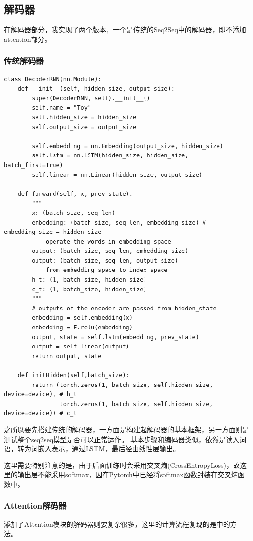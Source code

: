 \documentclass[logo,reportComp]{thesis}
\begin{document}
\subsection{解码器}
在解码器部分，我实现了两个版本，一个是传统的Seq2Seq中的解码器，即不添加attention部分。

\subsubsection{传统解码器}
\begin{lstlisting}
class DecoderRNN(nn.Module):
    def __init__(self, hidden_size, output_size):
        super(DecoderRNN, self).__init__()
        self.name = "Toy"
        self.hidden_size = hidden_size
        self.output_size = output_size

        self.embedding = nn.Embedding(output_size, hidden_size)
        self.lstm = nn.LSTM(hidden_size, hidden_size, batch_first=True)
        self.linear = nn.Linear(hidden_size, output_size)

    def forward(self, x, prev_state):
        """
        x: (batch_size, seq_len)
        embedding: (batch_size, seq_len, embedding_size) # embedding_size = hidden_size
            operate the words in embedding space
        output: (batch_size, seq_len, embedding_size)
        output: (batch_size, seq_len, output_size)
            from embedding space to index space
        h_t: (1, batch_size, hidden_size)
        c_t: (1, batch_size, hidden_size)
        """
        # outputs of the encoder are passed from hidden_state
        embedding = self.embedding(x)
        embedding = F.relu(embedding)
        output, state = self.lstm(embedding, prev_state)
        output = self.linear(output)
        return output, state

    def initHidden(self,batch_size):
        return (torch.zeros(1, batch_size, self.hidden_size, device=device), # h_t
                torch.zeros(1, batch_size, self.hidden_size, device=device)) # c_t
\end{lstlisting}

之所以要先搭建传统的解码器，一方面是构建起解码器的基本框架，另一方面则是测试整个seq2seq模型是否可以正常运作。
基本步骤和编码器类似，依然是读入词语，转为词嵌入表示，通过LSTM，最后经由线性层输出。

这里需要特别注意的是，由于后面训练时会采用交叉熵(CrossEntropyLoss)，故这里的输出层不能采用softmax，因在Pytorch中已经将softmax函数封装在交叉熵函数中。

\subsubsection{Attention解码器}
添加了Attention模块的解码器则要复杂很多，这里的计算流程复现的是\cite{bib:luong}中的方法。
\end{document}
